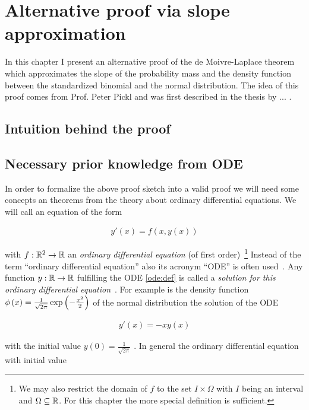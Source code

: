 \chapter{Alternative proof via slope approximation}

In this chapter I present an alternative proof of the de Moivre-Laplace theorem which approximates the slope of the probability mass and the density function between the standardized binomial and the normal distribution. The idea of this proof comes from Prof. Peter Pickl and was first described in the thesis by ... .

\section{Intuition behind the proof}

\section{Necessary prior knowledge from ODE}

In order to formalize the above proof sketch into a valid proof we will need some concepts an theorems from the theory about ordinary differential equations. We will call an equation of the form

\begin{align} \label{ode:def}
  y'(x) = f(x,y(x))
\end{align}

with $f:\mathbb R^2 \to \mathbb R$ an \emph{ordinary differential equation} (of first order)~\cite[p. 465]{stoer}\cite{wiki:ode}\footnote{We may also restrict the domain of $f$ to the set $I\times \Omega$ with $I$ being an interval and $\Omega\subseteq \mathbb R$. For this chapter the more special definition is sufficient.} Instead of the term ``ordinary differential equation'' also its acronym ``ODE'' is often used~\cite[p. 2]{ricardo}\cite{wiki:ode}. Any function $y:\mathbb R\to\mathbb R$ fulfilling the ODE \eqref{ode:def} is called a \emph{solution for this ordinary differential equation}~\cite[p. 8]{ricardo}\cite{wiki:ode}. For example is the density function $\phi\left( {x} \right) = \frac{1}{\sqrt{2\pi}} \exp\left( {-\frac{x^2}2} \right)$ of the normal distribution the solution of the ODE

\begin{align}
  y'(x) = -xy(x)
\end{align}

with the initial value $y(0) = \frac{1}{\sqrt{2\pi}}$ . In general the ordinary differential equation with initial value

